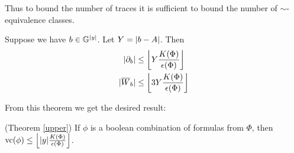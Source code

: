 Thus to bound the number of traces it is sufficient to bound the number of $\sim$-equivalence classes.

\begin{Theorem} \label{main_bound}
  Suppose we have $b \in \mathbb G^{|y|}$.
  Let $Y = \left|b - A\right|$.
  Then
  \begin{align*}
    |\partial_b| &\leq \left \lfloor Y \frac{K(\Phi)}{\epsilon(\Phi)}  \right \rfloor\\ 
    |{\overline{W}}_b| &\leq \left \lfloor 3 Y \frac{K(\Phi)}{\epsilon(\Phi)} \right \rfloor
  \end{align*}
\end{Theorem}

From this theorem we get the desired result:
\begin{Corollary} (Theorem \ref{upper})
  If $\phi$ is a boolean combination of formulas from $\Phi$, then $\operatorname{vc}(\phi) \leq \left \lfloor |y|\frac{K(\Phi)}{\epsilon(\Phi)} \right \rfloor$.
\end{Corollary}

